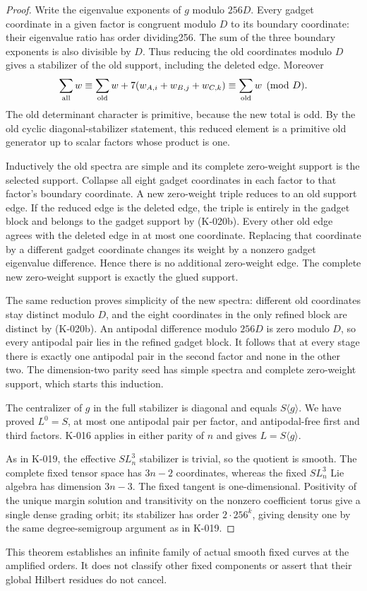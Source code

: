\begin{proof}
Write the eigenvalue exponents of $g$ modulo $256D$.
Every gadget coordinate in a given factor is congruent modulo
$D$ to its boundary coordinate: their eigenvalue ratio has order
dividing256.  The sum of the three boundary exponents is also
divisible by $D$.  Thus reducing the old coordinates modulo $D$
gives a stabilizer of the old support, including the deleted edge.
Moreover
\[
 \sum_{\rm all}w\equiv\sum_{\rm old}w+
              7(w_{A,i}+w_{B,j}+w_{C,k})
          \equiv\sum_{\rm old}w\pmod D.
\]
The old determinant character is primitive, because the new total
is odd.  By the old cyclic diagonal-stabilizer statement, this
reduced element is a primitive old generator up to scalar factors
whose product is one.

Inductively the old spectra are simple and its complete
zero-weight support is the selected support.  Collapse all eight
gadget coordinates in each factor to that factor's boundary
coordinate.  A new zero-weight triple reduces to an old support
edge.  If the reduced edge is the deleted edge, the triple is
entirely in the gadget block and belongs to the gadget support
by (K-020b).  Every other old edge agrees with the deleted edge
in at most one coordinate.  Replacing that coordinate by a
different gadget coordinate changes its weight by a nonzero
gadget eigenvalue difference.  Hence there is no additional
zero-weight edge.  The complete new zero-weight support is
exactly the glued support.

The same reduction proves simplicity of the new spectra:
different old coordinates stay distinct modulo $D$, and the
eight coordinates in the only refined block are distinct by
(K-020b).  An antipodal difference modulo $256D$ is zero modulo
$D$, so every antipodal pair lies in the refined gadget block.
It follows that at every stage there is exactly one antipodal
pair in the second factor and none in the other two.  The
dimension-two parity seed has simple spectra and complete
zero-weight support, which starts this induction.

The centralizer of $g$ in the full stabilizer is diagonal and
equals $S\langle g\rangle$.  We have proved $L^0=S$, at most one
antipodal pair per factor, and antipodal-free first and third
factors.  K-016 applies in either parity of $n$ and gives
$L=S\langle g\rangle$.

As in K-019, the effective $SL_n^3$ stabilizer is trivial, so the
quotient is smooth.  The complete fixed tensor space has
$3n-2$ coordinates, whereas the fixed $SL_n^3$ Lie algebra has
dimension $3n-3$.  The fixed tangent is one-dimensional.
Positivity of the unique margin solution and transitivity on
the nonzero coefficient torus give a single dense grading
orbit; its stabilizer has order $2\cdot256^k$, giving density
one by the same degree-semigroup argument as in K-019.
\end{proof}

This theorem establishes an infinite family of actual smooth
fixed curves at the amplified orders.  It does not classify other
fixed components or assert that their global Hilbert residues do
not cancel.
